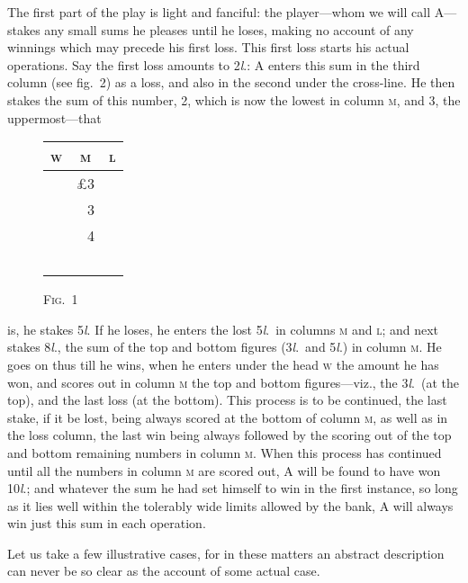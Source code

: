 \documentclass[letterpaper,12pt,oneside,openany]{memoir}
\begin{document}
The first part of the play is light and
fanciful: the player---whom we will call
A---stakes any small sums he pleases
until he loses, making no account of any
winnings which may precede his first loss. This first
loss starts his actual operations. Say the first loss
amounts to 2\textit{l}.: A enters this sum in the third column
(see fig.~2) as a loss, and also in the second under the
cross-line. He then stakes the sum of this number, 2,
which is now the lowest in column \textsc{m}, and 3, the uppermost---that
\begin{wrapfigure}[8]{l}{1.0in}
    \begin{tabular}{|c|r|c|}
        \hline
        \textsc{w} & \multicolumn{1}{c|}{\textsc{m}} & \textsc{l} \\
        \hline
        \, & \pounds 3 & \, \\
        \, & 3         & \, \\
        \, & 4         & \, \\
        \cline{2-2}
        \, & \,        & \, \\
        \hline
    \end{tabular}
    \begin{center}\textsc{Fig.~1}\end{center}
\end{wrapfigure}
is, he stakes 5\textit{l}. If he loses, he enters the
lost 5\textit{l}.\ in columns \textsc{m} and \textsc{l}; and next stakes 8\textit{l}., the
sum of the top and bottom figures (3\textit{l}.\ and 5\textit{l}.) in column
\textsc{m}. He goes on thus till he wins, when he enters under
the head \textsc{w} the amount he has won, and scores out in
column \textsc{m} the top and bottom figures---viz., the 3\textit{l}.\ (at
the top), and the last loss (at the bottom). This process
is to be continued, the last stake, if it be lost, being
always scored at the bottom of column \textsc{m}, as well as
in the loss column, the last win being always followed
by the scoring out of the top and bottom remaining
numbers in column \textsc{m}. When this process has continued
until all the numbers in column \textsc{m} are scored out, A will
be found to have won 10\textit{l}.; and whatever the sum he had
set himself to win in the first instance, so long as it lies
well within the tolerably wide limits allowed by the
bank, A will always win just this sum in each operation.

Let us take a few illustrative cases, for in these
matters an abstract description can never be so clear as
the account of some actual case.
\end{document}
